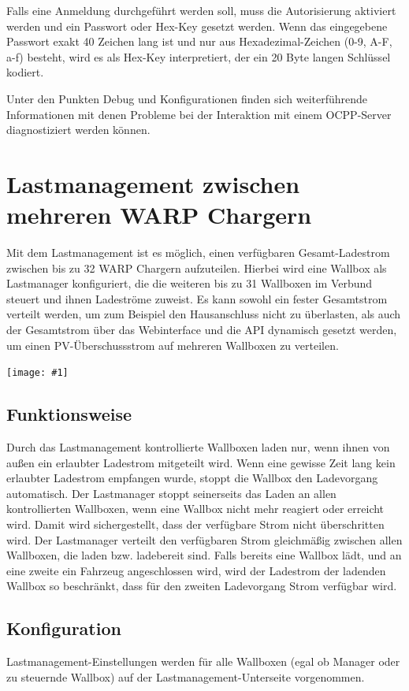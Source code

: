 \documentclass[a4paper,10pt]{article}
\newcommand{\gfx}[1]{\texttt{[image: \#1]}}
\begin{document}
\begin{multicols*}{2}
    Falls eine Anmeldung durchgeführt werden soll, muss die Autorisierung aktiviert werden
    und ein Passwort oder Hex-Key gesetzt werden. Wenn das eingegebene Passwort exakt 40 Zeichen lang ist
    und nur aus Hexadezimal-Zeichen (0-9, A-F, a-f) besteht, wird es als Hex-Key interpretiert, der ein 20
    Byte langen Schlüssel kodiert.

    Unter den Punkten Debug und Konfigurationen finden sich weiterführende Informationen mit denen Probleme
    bei der Interaktion mit einem OCPP-Server diagnostiziert werden können.

    \newpage
    \section{Lastmanagement zwischen mehreren WARP Chargern}\label{charge_manager}
    Mit dem Lastmanagement ist es möglich, einen verfügbaren Gesamt-Ladestrom
    zwischen bis zu 32 WARP Chargern aufzuteilen. Hierbei wird eine Wallbox als
    Lastmanager konfiguriert, die die weiteren bis zu 31 Wallboxen im Verbund steuert und ihnen Ladeströme
    zuweist. Es kann sowohl ein fester Gesamtstrom verteilt werden, um zum Beispiel den Hausanschluss nicht zu überlasten,
    als auch der Gesamtstrom über das Webinterface und die API dynamisch gesetzt
	werden, um einen PV-Überschussstrom auf mehreren Wallboxen zu verteilen.

    \gfx{./img_warp2/resized/web_charge_manager}

    \subsection{Funktionsweise}
    Durch das Lastmanagement kontrollierte Wallboxen laden nur,
    wenn ihnen von außen ein erlaubter Ladestrom mitgeteilt wird. Wenn eine gewisse Zeit lang
    kein erlaubter Ladestrom empfangen wurde, stoppt die Wallbox den Ladevorgang automatisch.
    Der Lastmanager stoppt seinerseits das Laden an allen kontrollierten Wallboxen,
    wenn eine Wallbox nicht mehr reagiert oder erreicht wird. Damit wird sichergestellt,
    dass der verfügbare Strom nicht überschritten wird.
    Der Lastmanager verteilt den verfügbaren Strom gleichmäßig zwischen allen Wallboxen, die laden bzw. ladebereit sind.
    Falls bereits eine Wallbox lädt, und an eine zweite ein Fahrzeug angeschlossen wird,
    wird der Ladestrom der ladenden Wallbox so beschränkt, dass für den zweiten Ladevorgang Strom verfügbar wird.

    \subsection{Konfiguration}
    \vspace{-0.1cm}
    Lastmanagement-Einstellungen werden für alle Wallboxen (egal ob Manager oder zu steuernde Wallbox) auf der
    Lastmanagement-Unterseite vorgenommen.


\end{multicols*}
\end{document}
